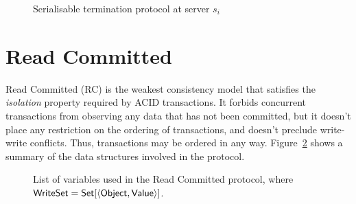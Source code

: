 \begin{figure}[h]
\begin{algorithm}[H]
  \smallskip

\end{algorithm}
\caption{Serialisable termination protocol at server $s_i$}
\label{fig:ser_termination}
\end{figure}

\clearpage

\section{Read Committed}
\label{appendix:rc}

Read Committed (RC) is the weakest consistency model that satisfies the \emph{isolation} property required by ACID transactions. It forbids concurrent transactions from observing any data that has not been committed, but it doesn't place any restriction on the ordering of transactions, and doesn't preclude write-write conflicts. Thus, transactions may be ordered in any way. Figure~\ref{fig:rc-prot-ds-table} shows a summary of the data structures involved in the protocol.

\begin{figure}[h]
\noindent{}
\caption{List of variables used in the Read Committed protocol, where ${\sf WriteSet} = {\sf Set}[\langle {\sf Object}, {\sf Value} \rangle]$.}
\label{fig:rc-prot-ds-table}
\end{figure}

